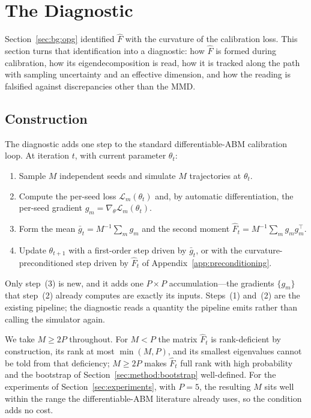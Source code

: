 \documentclass[10pt,twocolumn]{article}
\newcommand{\Fhat}{\hat{F}}
\newcommand{\Ltot}{\mathcal{L}}
\begin{document}
\section{The Diagnostic}
\label{sec:method}

Section~\ref{sec:bg:opg} identified $\Fhat$ with the curvature of the calibration
loss. This section turns that identification into a diagnostic: how $\Fhat$ is formed
during calibration, how its eigendecomposition is read, how it is tracked along the
path with sampling uncertainty and an effective dimension, and how the reading is
falsified against discrepancies other than the MMD.

\subsection{Construction}
\label{sec:method:pipeline}

The diagnostic adds one step to the standard differentiable-ABM calibration loop. At
iteration $t$, with current parameter $\theta_t$:
\begin{enumerate}
  \item Sample $M$ independent seeds and simulate $M$ trajectories at $\theta_t$.
  \item Compute the per-seed loss $\Ltot_m(\theta_t)$ and, by automatic
        differentiation, the per-seed gradient
        $g_m = \nabla_\theta \Ltot_m(\theta_t)$.
  \item Form the mean $\bar g_t = M^{-1}\sum_m g_m$ and the second moment
        $\Fhat_t = M^{-1}\sum_m g_m g_m^\top$.
  \item Update $\theta_{t+1}$ with a first-order step driven by $\bar g_t$, or with
        the curvature-preconditioned step driven by $\Fhat_t$ of
        Appendix~\ref{app:preconditioning}.
\end{enumerate}
Only step~(3) is new, and it adds one $P\times P$ accumulation---the gradients
$\{g_m\}$ that step~(2) already computes are exactly its inputs. Steps~(1) and~(2)
are the existing pipeline; the diagnostic reads a quantity the pipeline emits rather
than calling the simulator again.

We take $M \ge 2P$ throughout. For $M < P$ the matrix $\Fhat_t$ is rank-deficient by
construction, its rank at most $\min(M,P)$, and its smallest eigenvalues cannot be
told from that deficiency; $M \ge 2P$ makes $\Fhat_t$ full rank with high
probability and the bootstrap of Section~\ref{sec:method:bootstrap} well-defined.
For the experiments of Section~\ref{sec:experiments}, with $P=5$, the resulting $M$
sits well within the range the differentiable-ABM literature already uses, so the
condition adds no cost.
\end{document}
